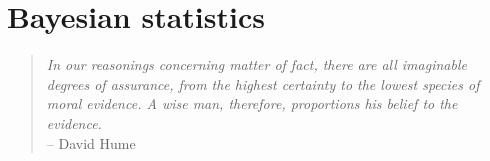 
\chapter{Bayesian statistics \label{ch:bayes}}

\begin{quote}
{\it In our reasonings concerning matter of fact, there are all imaginable degrees of assurance, from the highest certainty to the lowest species of moral evidence. A wise man, therefore, proportions his belief to the evidence.} \\
\hspace*{2cm} -- David Hume
\end{quote}


%
%




